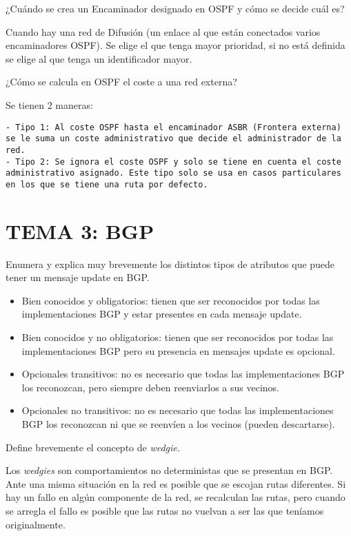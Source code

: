 \documentclass[]{article}
\providecommand{\tightlist}{%
  \setlength{\itemsep}{0pt}\setlength{\parskip}{0pt}}
\begin{document}
¿Cuándo se crea un Encaminador designado en OSPF y cómo se decide cuál
es?

Cuando hay una red de Difusión (un enlace al que están conectados varios
encaminadores OSPF). Se elige el que tenga mayor prioridad, si no está
definida se elige al que tenga un identificador mayor.

¿Cómo se calcula en OSPF el coste a una red externa?

Se tienen 2 maneras:

\begin{verbatim}
- Tipo 1: Al coste OSPF hasta el encaminador ASBR (Frontera externa) se le suma un coste administrativo que decide el administrador de la red.
- Tipo 2: Se ignora el coste OSPF y solo se tiene en cuenta el coste administrativo asignado. Este tipo solo se usa en casos particulares en los que se tiene una ruta por defecto.
\end{verbatim}

\hypertarget{tema-3-bgp}{%
\section{TEMA 3: BGP}\label{tema-3-bgp}}

Enumera y explica muy brevemente los distintos tipos de atributos que
puede tener un mensaje update en BGP.

\begin{itemize}
\tightlist
\item
  Bien conocidos y obligatorios: tienen que ser reconocidos por todas
  las implementaciones BGP y estar presentes en cada mensaje update.
\item
  Bien conocidos y no obligatorios: tienen que ser reconocidos por todas
  las implementaciones BGP pero su presencia en mensajes update es
  opcional.
\item
  Opcionales transitivos: no es necesario que todas las implementaciones
  BGP los reconozcan, pero siempre deben reenviarlos a sus vecinos.
\item
  Opcionales no transitivos: no es necesario que todas las
  implementaciones BGP los reconozcan ni que se reenvíen a los vecinos
  (pueden descartarse).
\end{itemize}

Define brevemente el concepto de \emph{wedgie.}

Los \emph{wedgies} son comportamientos no deterministas que se presentan
en BGP. Ante una misma situación en la red es posible que se escojan
rutas diferentes. Si hay un fallo en algún componente de la red, se
recalculan las rutas, pero cuando se arregla el fallo es posible que las
rutas no vuelvan a ser las que teníamos originalmente.
\end{document}
